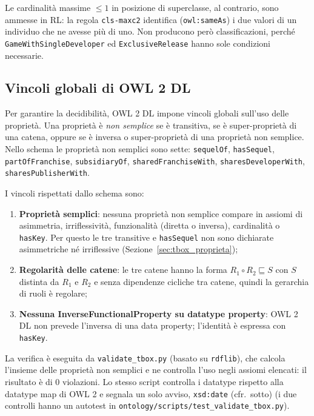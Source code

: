 Le cardinalit\`a massime ${\le}1$ in posizione di superclasse, al contrario, sono
ammesse in RL: la regola \texttt{cls-maxc2} identifica (\texttt{owl:sameAs}) i due valori
di un individuo che ne avesse pi\`u di uno. Non producono per\`o classificazioni,
perch\'e \texttt{GameWithSingleDeveloper} ed \texttt{ExclusiveRelease} hanno sole
condizioni necessarie.

\subsection{Vincoli globali di OWL 2 DL}

Per garantire la decidibilit\`a, OWL 2 DL impone vincoli globali sull'uso delle
propriet\`a. Una propriet\`a \`e \emph{non semplice} se \`e transitiva, se \`e
super-propriet\`a di una catena, oppure se \`e inversa o super-propriet\`a di una
propriet\`a non semplice. Nello schema le propriet\`a non semplici sono sette:
\texttt{sequelOf}, \texttt{hasSequel}, \texttt{partOfFranchise}, \texttt{subsidiaryOf},
\texttt{sharedFranchiseWith}, \texttt{sharesDeveloperWith}, \texttt{sharesPublisherWith}.

I vincoli rispettati dallo schema sono:
\begin{enumerate}[nosep]
  \item \textbf{Propriet\`a semplici}: nessuna propriet\`a non semplice compare in
    assiomi di asimmetria, irriflessivit\`a, funzionalit\`a (diretta o inversa),
    cardinalit\`a o \texttt{hasKey}. Per questo le tre transitive e \texttt{hasSequel}
    non sono dichiarate asimmetriche n\'e irriflessive (Sezione~\ref{sec:tbox_proprieta});
  \item \textbf{Regolarit\`a delle catene}: le tre catene hanno la forma
    $R_1 \circ R_2 \sqsubseteq S$ con $S$ distinta da $R_1$ e $R_2$ e senza dipendenze
    cicliche tra catene, quindi la gerarchia di ruoli \`e regolare;
  \item \textbf{Nessuna InverseFunctionalProperty su datatype property}: OWL 2 DL non
    prevede l'inversa di una data property; l'identit\`a \`e espressa con \texttt{hasKey}.
\end{enumerate}

La verifica \`e eseguita da \texttt{validate\_tbox.py} (basato su \texttt{rdflib}), che calcola
l'insieme delle propriet\`a non semplici e ne controlla l'uso negli assiomi elencati:
il risultato \`e di 0 violazioni. Lo stesso script controlla i datatype rispetto alla datatype map di
OWL 2 e segnala un solo avviso, \texttt{xsd:date} (cfr.\ sotto) (i due controlli hanno un autotest in \texttt{ontology/scripts/test\_validate\_tbox.py}).

